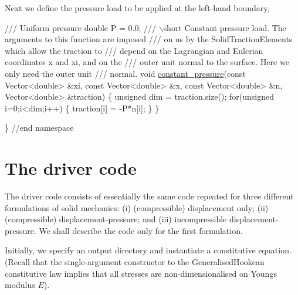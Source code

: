 Next we define the pressure load to be applied at the left-\/hand boundary,


\begin{DoxyCodeInclude}
 \textcolor{comment}{}
\textcolor{comment}{ /// Uniform pressure}
\textcolor{comment}{} \textcolor{keywordtype}{double} P = 0.0;
\textcolor{comment}{}
\textcolor{comment}{ /// \(\backslash\)short Constant pressure load. The arguments to this function are imposed}
\textcolor{comment}{ /// on us by the SolidTractionElements which allow the traction to }
\textcolor{comment}{ /// depend on the Lagrangian and Eulerian coordinates x and xi, and on the }
\textcolor{comment}{ /// outer unit normal to the surface. Here we only need the outer unit}
\textcolor{comment}{ /// normal.}
\textcolor{comment}{} \textcolor{keywordtype}{void} \hyperlink{namespaceGlobal__Physical__Variables_a19f4e20a92e7d216b4d2b00308f96917}{constant\_pressure}(\textcolor{keyword}{const} Vector<double> &xi, \textcolor{keyword}{const} Vector<double> &x,
                        \textcolor{keyword}{const} Vector<double> &n, Vector<double> &traction)
 \{
  \textcolor{keywordtype}{unsigned} dim = traction.size();
  \textcolor{keywordflow}{for}(\textcolor{keywordtype}{unsigned} i=0;i<dim;i++)
   \{
    traction[i] = -P*n[i];
   \}
 \} 

\} \textcolor{comment}{//end namespace}

\end{DoxyCodeInclude}




 

\hypertarget{index_main}{}\section{The driver code}\label{index_main}
The driver code consists of essentially the same code repeated for three different formulations of solid mechanics\+: (i) (compressible) displacement only; (ii) (compressible) displacement-\/pressure; and (iii) incompressible displacement-\/pressure. We shall describe the code only for the first formulation.

Initially, we specify an output directory and instantiate a constitutive equation. (Recall that the single-\/argument constructor to the {\ttfamily Generalised\+Hookean} constitutive law implies that all stresses are non-\/dimensionalised on Young\textquotesingle{}s modulus $ E $).

